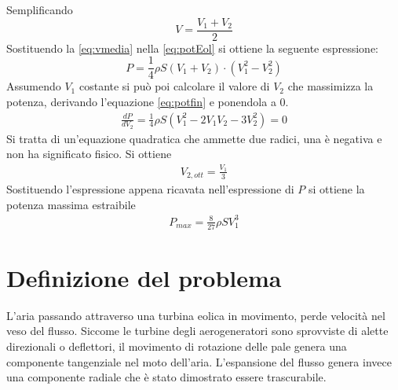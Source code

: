 Semplificando 
\begin{equation}\label{eq:vmedia}
V = \frac{V_1 + V_2}{2}
\end{equation}
Sostituendo la \ref{eq:vmedia} nella \ref{eq:potEol} si ottiene la seguente espressione:
\begin{equation}\label{eq:potfin}
P = \frac{1}{4} \rho S \left( V_1 +V_2 \right) \cdot \left(V_1^2 - V_2^2 \right)
\end{equation}
Assumendo $V_1$ costante si può poi calcolare il valore di $V_2$ che massimizza la potenza, derivando l'equazione \ref{eq:potfin} e ponendola a $0$. 
\begin{align*}
\frac{dP}{dV_2} = \frac{1}{4} \rho S \left( V_1^2 - 2 V_1 V_2 - 3 V_2^2 \right) = 0
\end{align*}
Si tratta di un'equazione quadratica che ammette due radici, una è negativa e non ha significato fisico. Si ottiene
\begin{align*}
V_{2,ott} = \frac{V_1}{3}
\end{align*}
Sostituendo l'espressione appena ricavata nell'espressione di $P$ si ottiene la potenza massima estraibile
\begin{align*}
P_{max} = \frac{8}{27} \rho S V_1^3 
\end{align*}

\section{Definizione del problema}
L'aria passando attraverso una turbina eolica in movimento, perde velocità nel veso del flusso. Siccome le turbine degli aerogeneratori sono sprovviste di alette direzionali o deflettori, il movimento di rotazione delle pale genera una componente tangenziale nel moto dell'aria. L'espansione del flusso genera invece una componente radiale che è stato dimostrato essere trascurabile. 

